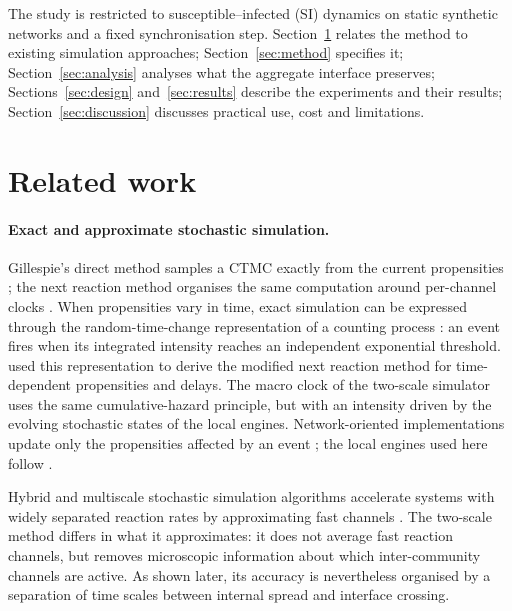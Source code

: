 \documentclass[a4paper,fleqn]{cas-sc}
\begin{document}
The study is restricted to susceptible--infected (SI) dynamics on static synthetic networks and a fixed synchronisation step. Section~\ref{sec:related} relates the method to existing simulation approaches; Section~\ref{sec:method} specifies it; Section~\ref{sec:analysis} analyses what the aggregate interface preserves; Sections~\ref{sec:design} and~\ref{sec:results} describe the experiments and their results; Section~\ref{sec:discussion} discusses practical use, cost and limitations.

\clearpage
\section{Related work}
\label{sec:related}

\paragraph{Exact and approximate stochastic simulation.}
Gillespie's direct method samples a CTMC exactly from the current propensities \citep{gillespie1977exact}; the next reaction method organises the same computation around per-channel clocks \citep{gibson2000}. When propensities vary in time, exact simulation can be expressed through the random-time-change representation of a counting process \citep{ethier1986}: an event fires when its integrated intensity reaches an independent exponential threshold. \citet{anderson2007} used this representation to derive the modified next reaction method for time-dependent propensities and delays. The macro clock of the two-scale simulator uses the same cumulative-hazard principle, but with an intensity driven by the evolving stochastic states of the local engines. Network-oriented implementations update only the propensities affected by an event \citep{vestergaard2015,kuryliak2025simulating}; the local engines used here follow \citet{kuryliak2025simulating}.

Hybrid and multiscale stochastic simulation algorithms accelerate systems with widely separated reaction rates by approximating fast channels \citep{haseltine2002,cao2005slow}. The two-scale method differs in what it approximates: it does not average fast reaction channels, but removes microscopic information about which inter-community channels are active. As shown later, its accuracy is nevertheless organised by a separation of time scales between internal spread and interface crossing.
\end{document}
